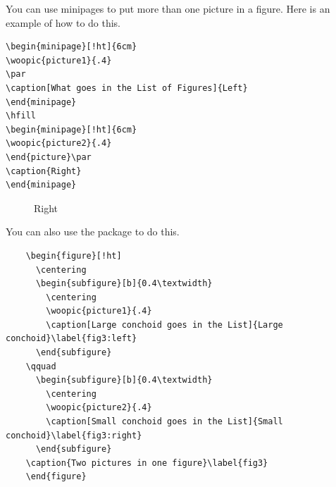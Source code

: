 You can use minipages to put more than one picture in a figure. Here is an example of how to do this.
\begin{singlespace}\small
\begin{verbatim}
\begin{minipage}[!ht]{6cm}
\woopic{picture1}{.4}
\par
\caption[What goes in the List of Figures]{Left}
\end{minipage}
\hfill
\begin{minipage}[!ht]{6cm}
\woopic{picture2}{.4}
\end{picture}\par
\caption{Right}
\end{minipage}
\end{verbatim}
\end{singlespace}
\begin{figure}[!ht]
\begin{minipage}[!ht]{6cm}
\par
\caption[What goes in the List of Figures]{Left}
\end{minipage}
\hfill
\begin{minipage}[!ht]{6cm}
\par
\caption{Right}
\end{minipage}
\end{figure}

You can also use the  package to do this. %

\begin{singlespace}\small
  \begin{verbatim}
    \begin{figure}[!ht]
      \centering
      \begin{subfigure}[b]{0.4\textwidth}
        \centering
        \woopic{picture1}{.4}
        \caption[Large conchoid goes in the List]{Large conchoid}\label{fig3:left}
      \end{subfigure}
    \qquad
      \begin{subfigure}[b]{0.4\textwidth}
        \centering
        \woopic{picture2}{.4}
        \caption[Small conchoid goes in the List]{Small conchoid}\label{fig3:right}
      \end{subfigure}
    \caption{Two pictures in one figure}\label{fig3}
    \end{figure}
  \end{verbatim}
\end{singlespace}

